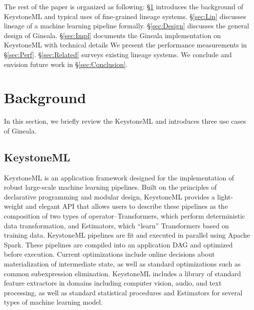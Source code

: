 \documentclass{sig-alternate}
\begin{document}
The rest of the paper is organized as following: 
\S\ref{sec:Background} introduces the background of KeystoneML and typical uses of fine-grained lineage systems. 
\S\ref{sec:Lin} discusses lineage of a machine learning pipeline formally.
\S\ref{sec:Design} discusses the general design of Gineala.
\S\ref{sec:Impl} documents the Gineala implementation on KeystoneML with technical details
We present the performance measurements in \S\ref{sec:Perf}.
\S\ref{sec:Related} surveys existing lineage systems.
We conclude and envision future work in \S\ref{sec:Conclusion}.

\section{Background}
\label{sec:Background}
In this section, we briefly review the KeystoneML and introduces three use cases of Gineala.

\subsection{KeystoneML}
KeystoneML is an application framework designed for the implementation of robust large-scale machine learning pipelines. Built on the principles of declarative programming and modular design, KeystoneML provides a light-weight and elegant API that allows users to describe these pipelines as the composition of two types of operator--Transformers, which perform deterministic data transformation, and Estimators, which ``learn'' Transformers based on training data. KeystoneML pipelines are fit and executed in parallel using Apache Spark. These pipelines are compiled into an application DAG and optimized before execution. Current optimizations include online decisions about materialization of intermediate state, as well as standard optimizations such as common subexpression elimination. KeystoneML includes a library of standard feature extractors in domains including computer vision, audio, and text processing, as well as standard statistical procedures and Estimators for several types of machine learning model.
\end{document}
